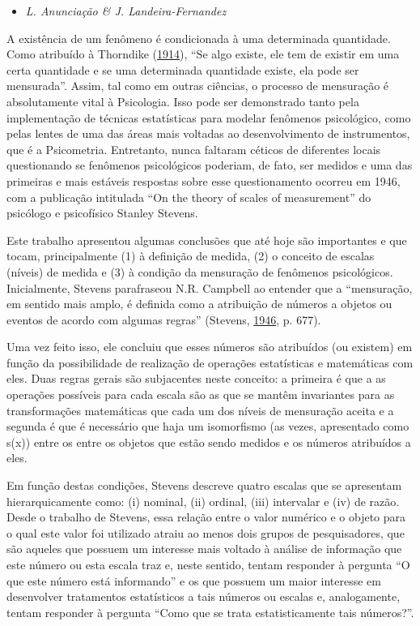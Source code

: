 \documentclass[
]{book}
\providecommand{\tightlist}{%
  \setlength{\itemsep}{0pt}\setlength{\parskip}{0pt}}
\begin{document}
\begin{itemize}
\tightlist
\item
  \emph{L. Anunciação \& J. Landeira-Fernandez}
\end{itemize}

A existência de um fenômeno é condicionada à uma determinada quantidade.
Como atribuído à Thorndike
(\protect\hyperlink{ref-Thorndike1914}{1914}), ``Se algo existe, ele tem
de existir em uma certa quantidade e se uma determinada quantidade
existe, ela pode ser mensurada''. Assim, tal como em outras ciências, o
processo de mensuração é absolutamente vital à Psicologia. Isso pode ser
demonstrado tanto pela implementação de técnicas estatísticas para
modelar fenômenos psicológico, como pelas lentes de uma das áreas mais
voltadas ao desenvolvimento de instrumentos, que é a Psicometria.
Entretanto, nunca faltaram céticos de diferentes locais questionando se
fenômenos psicológicos poderiam, de fato, ser medidos e uma das
primeiras e mais estáveis respostas sobre esse questionamento ocorreu em
1946, com a publicação intitulada ``On the theory of scales of
measurement'' do psicólogo e psicofísico Stanley Stevens.

Este trabalho apresentou algumas conclusões que até hoje são importantes
e que tocam, principalmente (1) à definição de medida, (2) o conceito de
escalas (níveis) de medida e (3) à condição da mensuração de fenômenos
psicológicos. Inicialmente, Stevens parafraseou N.R. Campbell ao
entender que a ``mensuração, em sentido mais amplo, é definida como a
atribuição de números a objetos ou eventos de acordo com algumas
regras'' (Stevens, \protect\hyperlink{ref-Stevens1946}{1946}, p. 677).

Uma vez feito isso, ele concluiu que esses números são atribuídos (ou
existem) em função da possibilidade de realização de operações
estatísticas e matemáticas com eles. Duas regras gerais são subjacentes
neste conceito: a primeira é que a as operações possíveis para cada
escala são as que se mantêm invariantes para as transformações
matemáticas que cada um dos níveis de mensuração aceita e a segunda é
que é necessário que haja um isomorfismo (as vezes, apresentado como
s(x)) entre os entre os objetos que estão sendo medidos e os números
atribuídos a eles.

Em função destas condições, Stevens descreve quatro escalas que se
apresentam hierarquicamente como: (i) nominal, (ii) ordinal, (iii)
intervalar e (iv) de razão. Desde o trabalho de Stevens, essa relação
entre o valor numérico e o objeto para o qual este valor foi utilizado
atraiu ao menos dois grupos de pesquisadores, que são aqueles que
possuem um interesse mais voltado à análise de informação que este
número ou esta escala traz e, neste sentido, tentam responder à pergunta
``O que este número está informando'' e os que possuem um maior
interesse em desenvolver tratamentos estatísticos a tais números ou
escalas e, analogamente, tentam responder à pergunta ``Como que se trata
estatisticamente tais números?''.
\end{document}
